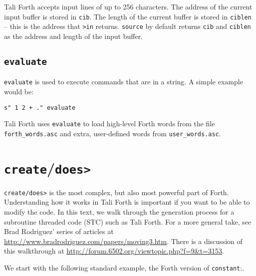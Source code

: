 Tali Forth accepts input lines of up to 256 characters. The
address of the current input buffer is stored in
\texttt{cib}.  The length of the current
buffer is stored in \texttt{ciblen} -- this is the address that
\texttt{>in} returns.
\texttt{source} by default returns \texttt{cib}
and \texttt{ciblen} as the address and length of the input buffer. 


\subsection{\texttt{evaluate}}

\texttt{evaluate} is used to execute commands that are in a string. A simple
example would be:

\begin{lstlisting}[frame=lines]
        s" 1 2 + ." evaluate
\end{lstlisting}

\noindent Tali Forth uses \texttt{evaluate} to load high-level Forth words from
the file
\texttt{forth\_words.asc} and
extra, user-defined words from
\texttt{user\_words.asc}. 

\section{\texttt{create}/\texttt{does>}}

\texttt{create/does>} is the most complex, but also most powerful part of Forth.
Understanding how it works in Tali Forth is important if you want to be able to
modify the code. In this text, we walk through the generation process for a
subroutine threaded code (STC) such as Tali Forth. For a more
general take, see Brad Rodriguez' series of articles at
\href{http://www.bradrodriguez.com/papers/moving3.htm}{http://www.bradrodriguez.com/papers/moving3.htm}.
There is a discussion of this walkthrough at
\href{http://forum.6502.org/viewtopic.php?f=9\&t=3153}{http://forum.6502.org/viewtopic.php?f=9\&t=3153}. 

We start with the following standard example, the Forth version of
\texttt{constant}:. 

